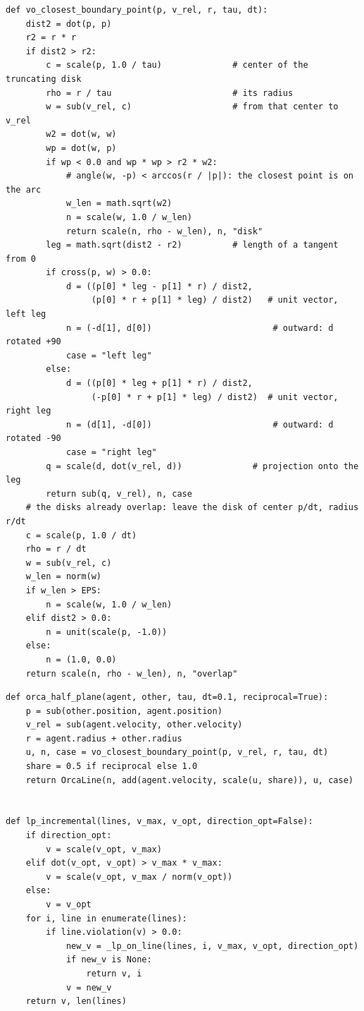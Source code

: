 \begin{lstlisting}[caption={The case analysis of \cref{thm:ch13-cases} (from \code{code/ch13\_orca.py}, docstring omitted). The function returns $\vect{u}$, $\vect{n}$ and the name of the case.},label={lst:ch13-cases}]
def vo_closest_boundary_point(p, v_rel, r, tau, dt):
    dist2 = dot(p, p)
    r2 = r * r
    if dist2 > r2:
        c = scale(p, 1.0 / tau)              # center of the truncating disk
        rho = r / tau                        # its radius
        w = sub(v_rel, c)                    # from that center to v_rel
        w2 = dot(w, w)
        wp = dot(w, p)
        if wp < 0.0 and wp * wp > r2 * w2:
            # angle(w, -p) < arccos(r / |p|): the closest point is on the arc
            w_len = math.sqrt(w2)
            n = scale(w, 1.0 / w_len)
            return scale(n, rho - w_len), n, "disk"
        leg = math.sqrt(dist2 - r2)          # length of a tangent from 0
        if cross(p, w) > 0.0:
            d = ((p[0] * leg - p[1] * r) / dist2,
                 (p[0] * r + p[1] * leg) / dist2)   # unit vector, left leg
            n = (-d[1], d[0])                        # outward: d rotated +90
            case = "left leg"
        else:
            d = ((p[0] * leg + p[1] * r) / dist2,
                 (-p[0] * r + p[1] * leg) / dist2)  # unit vector, right leg
            n = (d[1], -d[0])                        # outward: d rotated -90
            case = "right leg"
        q = scale(d, dot(v_rel, d))              # projection onto the leg
        return sub(q, v_rel), n, case
    # the disks already overlap: leave the disk of center p/dt, radius r/dt
    c = scale(p, 1.0 / dt)
    rho = r / dt
    w = sub(v_rel, c)
    w_len = norm(w)
    if w_len > EPS:
        n = scale(w, 1.0 / w_len)
    elif dist2 > 0.0:
        n = unit(scale(p, -1.0))
    else:
        n = (1.0, 0.0)
    return scale(n, rho - w_len), n, "overlap"
\end{lstlisting}

\begin{lstlisting}[caption={The half-plane (\cref{alg:ch13-halfplane}) and the incremental program (\cref{alg:ch13-lp}); \code{HalfPlane.violation(v)} is $-(\vel - \vect{q})\cdot\vect{n}$ and \code{direction} is $\vect{n}$ rotated by $-90^\circ$.},label={lst:ch13-lp}]
def orca_half_plane(agent, other, tau, dt=0.1, reciprocal=True):
    p = sub(other.position, agent.position)
    v_rel = sub(agent.velocity, other.velocity)
    r = agent.radius + other.radius
    u, n, case = vo_closest_boundary_point(p, v_rel, r, tau, dt)
    share = 0.5 if reciprocal else 1.0
    return OrcaLine(n, add(agent.velocity, scale(u, share)), u, case)


def lp_incremental(lines, v_max, v_opt, direction_opt=False):
    if direction_opt:
        v = scale(v_opt, v_max)
    elif dot(v_opt, v_opt) > v_max * v_max:
        v = scale(v_opt, v_max / norm(v_opt))
    else:
        v = v_opt
    for i, line in enumerate(lines):
        if line.violation(v) > 0.0:
            new_v = _lp_on_line(lines, i, v_max, v_opt, direction_opt)
            if new_v is None:
                return v, i
            v = new_v
    return v, len(lines)
\end{lstlisting}


